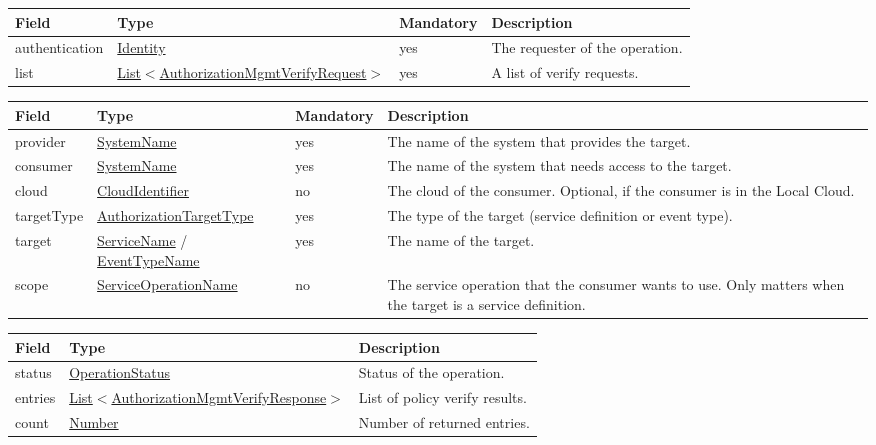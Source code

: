 \documentclass[a4paper]{arrowhead}
\newcommand{\pref}[1]{{\textcolor{ArrowheadGrey}{\hyperref[sec:model:primitives:#1]{#1}}}}
\begin{document}

\begin{table}[ht!]
\begin{tabularx}{\textwidth}{| p{3cm} | p{6cm} | p{2cm} | X |} \hline
\rowcolor{gray!33} Field & Type & Mandatory & Description \\ \hline
authentication &\hyperref[sec:model:Identity]{Identity} & yes & The requester of the operation. \\ \hline
list & \pref{List}$<$\hyperref[sec:model:AuthorizationMgmtVerifyRequest]{AuthorizationMgmtVerifyRequest}$>$ & yes & A list of verify requests. \\ \hline
\end{tabularx}
\end{table}


\begin{table}[ht!]
\begin{tabularx}{\textwidth}{| p{3cm} | p{4cm} | p{2cm} | X |} \hline
\rowcolor{gray!33} Field & Type & Mandatory & Description \\ \hline
provider & \pref{SystemName} & yes & The name of the system that provides the target. \\ \hline
consumer & \pref{SystemName} & yes & The name of the system that needs access to the target. \\ \hline
cloud & \pref{CloudIdentifier} & no & The cloud of the consumer. Optional, if the consumer is in the Local Cloud. \\ \hline
targetType & \pref{AuthorizationTargetType} & yes & The type of the target (service definition or event type). \\ \hline
target & \pref{ServiceName} / \pref{EventTypeName} & yes & The name of the target. \\ \hline
scope & \pref{ServiceOperationName} & no & The service operation that the consumer wants to use. Only matters when the target is a service definition. \\ \hline
\end{tabularx}
\end{table}


\begin{table}[ht!]
\begin{tabularx}{\textwidth}{| p{2.5cm} | p{6.5cm} | X |} \hline
\rowcolor{gray!33} Field & Type    & Description \\ \hline
status & \pref{OperationStatus} & Status of the operation. \\ \hline
entries & \pref{List}$<$\hyperref[sec:model:AuthorizationMgmtVerifyResponse]{AuthorizationMgmtVerifyResponse}$>$  & List of policy verify results. \\ \hline
count & \pref{Number} & Number of returned entries. \\ \hline
\end{tabularx}
\end{table}
\end{document}
